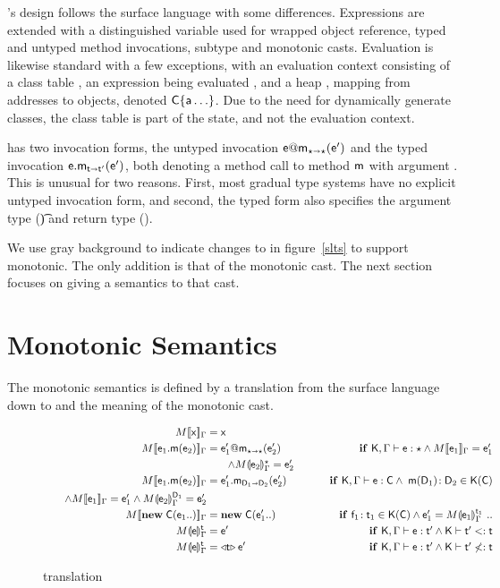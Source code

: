 \documentclass[sigconf]{acmart}
\begin{document}
\kafka's design follows the surface language with some differences.
Expressions are extended with \that a distinguished variable used for
wrapped object reference, typed and untyped method invocations, subtype and
monotonic casts.  Evaluation is likewise standard with a few exceptions,
with an evaluation context consisting of a class table \K, an expression
being evaluated \e, and a heap \s, mapping from addresses \a to objects,
denoted $\C\{\a\ldots\}$. Due to the need for dynamically generate classes,
the class table \K is part of the state, and not the evaluation context.

\kafka has two invocation forms, the untyped invocation $\DynCall\e\m\ep$
and the typed invocation $\KCall\e\m\ep{\t}{\tp}$, both denoting a method
call to method ${\sf{m}}$ with argument \ep. This is unusual for two
reasons. First, most gradual type systems have no explicit untyped
invocation form, and second, the typed form also specifies the argument type
(\t) and return type (\tp).

We use gray background to indicate changes to \kafka in figure~\ref{slts} to
support monotonic. The only addition is that of the monotonic cast. The next
section focuses on giving a semantics to that cast.


\section{Monotonic Semantics}

The monotonic semantics is defined by a translation from the surface
language down to \kafka and the meaning of the monotonic cast.

\begin{figure}[!h]

\begin{align*}
\TRG[M]{\x}\Env &= \x & \\
\TRG[M]{\Call{\e_1}\m{{\e_2}}}\Env &= \DynCall{\ep_1}\m{\ep_2} & \tag*{\IF\EM{\TypeCk{\K,\Env}\e\any
\AND \TRG[M]{\e_1}\Env = \ep_1}} \\ &\tag*{\EM{\wedge \TAG[M]{\e_2}\Env{\any} = \ep_2}}\\
\TRG[M]{\Call{\e_1}\m{{\e_2}}}\Env &= \KCall{\ep_1}\m{\ep_2}{\D[1]}{\D[2]} & \tag*{\IF\EM{\TypeCk{\K,\Env}\e\C
\AND\; \Mtype\m{\D[1]}{\D[2]}\In\App\K\C}}\\
\tag*{\EM{\AND \TRG[M]{\e_1}\Env = \ep_1 \wedge \TAG[M]{\e_2}\Env{\D[1]} = \ep_2}}\\
\TRG[M]{\New\C{{\e_1}..}}\Env &= \New\C{\ep_1..} & \tag*{\IF\EM{\Ftype{\f[1]}{\t[1]}\In\App\K\C
    \AND \ep[1] = \TAG[M]{\e[1]}\Env{\t[1]} ~..}}\\
\TAG[M]{\e}{\Env}\t &= \e' & \tag*{\IF\EM{\TypeCk{\K,\Env}\e\tp \AND \K\vdash\tp\Sub\t}}\\
\TAG[M]{\e}{\Env}\t &= \MonCast{\t}{\ep} & \tag*{\IF\EM{\TypeCk{\K,\Env}\e\tp \AND \K\vdash\tp\not\Sub\t}}
\end{align*}

\caption{translation}
\end{figure}
\end{document}
